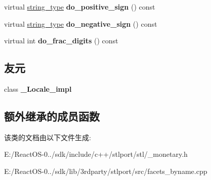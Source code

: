 \begin{DoxyCompactItemize}
\mbox{\label{classmoneypunct__byname_3_01char_00_01true_01_4_ae38e8390c619eb7af03546beb3ebbc05}} 
virtual \hyperlink{structstring}{string\+\_\+type} {\bfseries do\+\_\+positive\+\_\+sign} () const
\item 
\mbox{\label{classmoneypunct__byname_3_01char_00_01true_01_4_addbe72880eb6b77acf00bebc5161ea4f}} 
virtual \hyperlink{structstring}{string\+\_\+type} {\bfseries do\+\_\+negative\+\_\+sign} () const
\item 
\mbox{\label{classmoneypunct__byname_3_01char_00_01true_01_4_adb0d4fce77f2837eafa73b45882444f1}} 
virtual int {\bfseries do\+\_\+frac\+\_\+digits} () const
\end{DoxyCompactItemize}
\subsection*{友元}
\begin{DoxyCompactItemize}
\item 
\mbox{\label{classmoneypunct__byname_3_01char_00_01true_01_4_ae9c09ac7cd16ad35f8fdb1587ac77eb8}} 
class {\bfseries \+\_\+\+Locale\+\_\+impl}
\end{DoxyCompactItemize}
\subsection*{额外继承的成员函数}


该类的文档由以下文件生成\+:\begin{DoxyCompactItemize}
\item 
E\+:/\+React\+O\+S-\/0../sdk/include/c++/stlport/stl/\+\_\+monetary.\+h\item 
E\+:/\+React\+O\+S-\/0../sdk/lib/3rdparty/stlport/src/facets\+\_\+byname.\+cpp\end{DoxyCompactItemize}
